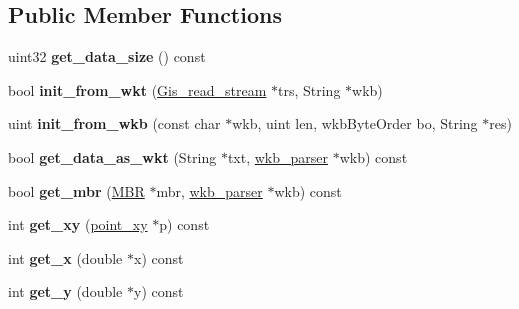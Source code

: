 \subsection*{Public Member Functions}
\begin{DoxyCompactItemize}
\item 
\mbox{\label{classGis__point_a79e607bb290edc8b1a4e86b79a97f22a}} 
uint32 {\bfseries get\+\_\+data\+\_\+size} () const
\item 
\mbox{\label{classGis__point_a64dd5abd2a543747750b9e4d07ac0cd7}} 
bool {\bfseries init\+\_\+from\+\_\+wkt} (\mbox{\hyperlink{classGis__read__stream}{Gis\+\_\+read\+\_\+stream}} $\ast$trs, String $\ast$wkb)
\item 
\mbox{\label{classGis__point_a5296d038670df3fcbdae4d006eda0bce}} 
uint {\bfseries init\+\_\+from\+\_\+wkb} (const char $\ast$wkb, uint len, wkb\+Byte\+Order bo, String $\ast$res)
\item 
\mbox{\label{classGis__point_a10cc1c1ec090e12c83a5fcb556577a52}} 
bool {\bfseries get\+\_\+data\+\_\+as\+\_\+wkt} (String $\ast$txt, \mbox{\hyperlink{classGeometry_1_1wkb__parser}{wkb\+\_\+parser}} $\ast$wkb) const
\item 
\mbox{\label{classGis__point_a898ab61cc39bb5cde1beedd34af2b848}} 
bool {\bfseries get\+\_\+mbr} (\mbox{\hyperlink{structMBR}{M\+BR}} $\ast$mbr, \mbox{\hyperlink{classGeometry_1_1wkb__parser}{wkb\+\_\+parser}} $\ast$wkb) const
\item 
\mbox{\label{classGis__point_aa458a191406eb4757660c27a25f4016a}} 
int {\bfseries get\+\_\+xy} (\mbox{\hyperlink{classpoint__xy}{point\+\_\+xy}} $\ast$p) const
\item 
\mbox{\label{classGis__point_ac84e30fdbdb53bd5a469f97fed0fec45}} 
int {\bfseries get\+\_\+x} (double $\ast$x) const
\item 
\mbox{\label{classGis__point_a8e6cb4958ee03cf661801bdf4b4782fc}} 
int {\bfseries get\+\_\+y} (double $\ast$y) const
\item 
\mbox{\label{classGis__point_a4dd8555722822221bcf12ce4ec891e0a}} 

\end{DoxyCompactItemize}
